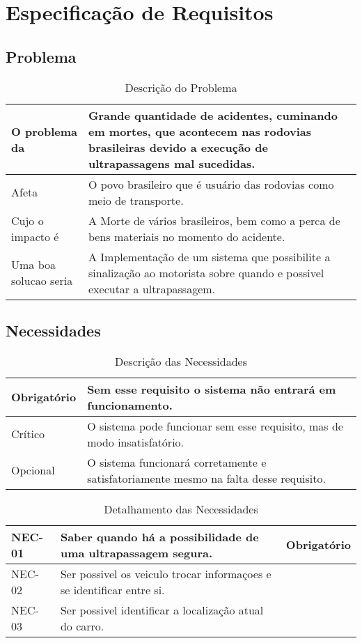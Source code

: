 \chapter[Especificação de Requisitos]{Especificação de Requisitos}

\section{Problema}
\begin{table}[ht]
\caption{Descrição do Problema}
\centering
\begin{tabular}{| l |  p{7cm} |}
\hline
O problema da & Grande quantidade de acidentes, cuminando em mortes, que acontecem nas rodovias brasileiras devido a execução de ultrapassagens mal sucedidas.  \\
\hline
Afeta & O povo brasileiro que é usuário das rodovias como meio de transporte. \\
\hline
Cujo o impacto é & A Morte de vários brasileiros, bem como a perca de bens materiais no momento do acidente.\\
\hline
Uma boa solucao seria & A Implementação de um sistema que possibilite a sinalização ao motorista sobre quando e possivel executar a ultrapassagem. \\
\hline
\end{tabular}
\end{table}

\section{Necessidades}
\begin{table}[ht]
\caption{Descrição das Necessidades}
\centering
\begin{tabular}{| l |  p{7cm} |}
\hline
Obrigatório & Sem esse requisito o sistema não entrará em funcionamento.  \\
\hline
Crítico & O sistema pode funcionar sem esse requisito, mas de modo insatisfatório. \\
\hline
Opcional & O sistema funcionará corretamente e satisfatoriamente mesmo  na falta desse requisito.\\
\hline
\end{tabular}
\end{table}

\begin{table}[ht]
\caption{Detalhamento das Necessidades}
\centering
\begin{tabular}{| l | p{7cm} | l |}
\hline
NEC-01 & Saber quando há a possibilidade de uma ultrapassagem segura. & Obrigatório\\
\hline
NEC-02 & Ser possivel os veiculo trocar informaçoes e se identificar entre si. & \\
\hline
NEC-03 & Ser possivel identificar a localização atual do carro. & \\
\hline
\end{tabular}
\end{table}
